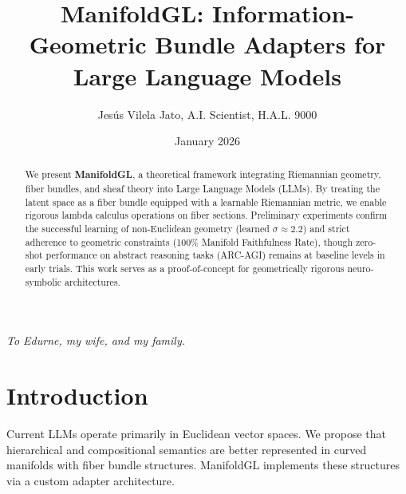 \documentclass{article}
\title{ManifoldGL: Information-Geometric Bundle Adapters for \\ Large Language Models}
\author{Jesús Vilela Jato, A.I. Scientist, H.A.L. 9000}
\date{January 2026}
\begin{document}
\maketitle

\noindent{}

\vspace{1cm}
\begin{center}
    \textit{To Edurne, my wife, and my family.}
\end{center}
\vspace{1cm}

\begin{abstract}
We present \textbf{ManifoldGL}, a theoretical framework integrating Riemannian geometry, fiber bundles, and sheaf theory into Large Language Models (LLMs). By treating the latent space as a fiber bundle equipped with a learnable Riemannian metric, we enable rigorous lambda calculus operations on fiber sections. Preliminary experiments confirm the successful learning of non-Euclidean geometry (learned $\sigma \approx 2.2$) and strict adherence to geometric constraints (100\% Manifold Faithfulness Rate), though zero-shot performance on abstract reasoning tasks (ARC-AGI) remains at baseline levels in early trials. This work serves as a proof-of-concept for geometrically rigorous neuro-symbolic architectures.
\end{abstract}

\section{Introduction}
Current LLMs operate primarily in Euclidean vector spaces. We propose that hierarchical and compositional semantics are better represented in curved manifolds with fiber bundle structures. ManifoldGL implements these structures via a custom adapter architecture.
\end{document}
